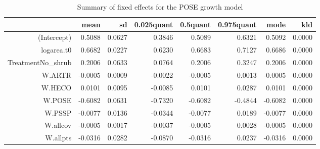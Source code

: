 \begin{table}[ht]
\centering
\caption{Summary of fixed effects for the POSE growth model} 
\label{POSEgrowth}
\begin{tabular}{rrrrrrrr}
  \hline
 & mean & sd & 0.025quant & 0.5quant & 0.975quant & mode & kld \\ 
  \hline
(Intercept) & 0.5088 & 0.0627 & 0.3846 & 0.5089 & 0.6321 & 0.5092 & 0.0000 \\ 
  logarea.t0 & 0.6682 & 0.0227 & 0.6230 & 0.6683 & 0.7127 & 0.6686 & 0.0000 \\ 
  TreatmentNo\_shrub & 0.2006 & 0.0633 & 0.0764 & 0.2006 & 0.3247 & 0.2006 & 0.0000 \\ 
  W.ARTR & -0.0005 & 0.0009 & -0.0022 & -0.0005 & 0.0013 & -0.0005 & 0.0000 \\ 
  W.HECO & 0.0101 & 0.0095 & -0.0085 & 0.0101 & 0.0287 & 0.0101 & 0.0000 \\ 
  W.POSE & -0.6082 & 0.0631 & -0.7320 & -0.6082 & -0.4844 & -0.6082 & 0.0000 \\ 
  W.PSSP & -0.0077 & 0.0136 & -0.0344 & -0.0077 & 0.0189 & -0.0077 & 0.0000 \\ 
  W.allcov & -0.0005 & 0.0017 & -0.0037 & -0.0005 & 0.0028 & -0.0005 & 0.0000 \\ 
  W.allpts & -0.0316 & 0.0282 & -0.0870 & -0.0316 & 0.0237 & -0.0316 & 0.0000 \\ 
   \hline
\end{tabular}
\end{table}

